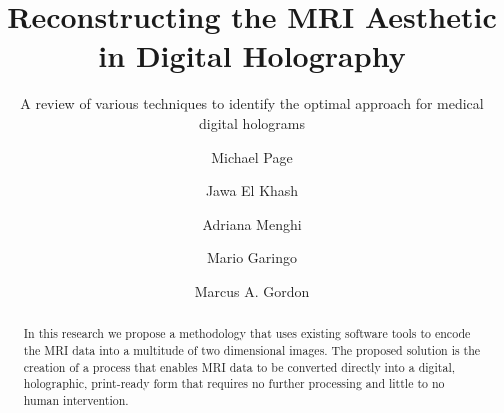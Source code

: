 \documentclass[acmlarge,screen]{acmart}
\begin{document}
%
\title{Reconstructing the MRI Aesthetic in Digital Holography}
\subtitle{A review of various techniques to identify the optimal approach for medical digital holograms}

%
\author{Michael Page}

\author{Jawa El Khash}

\author{Adriana Menghi}

\author{Mario Garingo}

\author{Marcus A. Gordon}

%
\renewcommand{\shortauthors}{Page and Gordon, et al.}

%
\begin{abstract}

In this research we propose a methodology that uses existing software tools to encode the MRI data into a multitude of two dimensional images. The proposed solution is the creation of a process that enables MRI data to be converted directly into a digital, holographic, print-ready form that requires no further processing and little to no human intervention.
\end{abstract}
\end{document}
